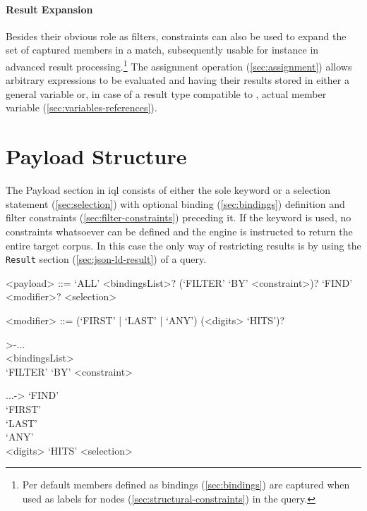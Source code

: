 \documentclass[11pt,a4paper]{report}
\newcommand{\iqlType}[1]{\texttt{\iqlns#1}}
\begin{document}
\paragraph{Result Expansion}
Besides their obvious role as filters, constraints can also be used to expand the set of captured members in a match, subsequently usable for instance in advanced result processing.\footnote{Per default members defined as bindings (\ref{sec:bindings}) are captured when used as labels for nodes (\ref{sec:structural-constraints}) in the query.}
The assignment operation (\ref{sec:assignment}) allows arbitrary expressions to be evaluated and having their results stored in either a general variable or, in case of a result type compatible to , actual member variable (\ref{sec:variables-references}).

\section{Payload Structure}
\label{sec:payload-structure}

The Payload section in \ac{iql} consists of either the sole  keyword or a selection statement (\ref{sec:selection}) with optional binding (\ref{sec:bindings}) definition and filter constraints (\ref{sec:filter-constraints}) preceding it.
If the  keyword is used, no constraints whatsoever can be defined and the engine is instructed to return the entire target corpus.
In this case the only way of restricting results is by using the \iqlType{Result} section (\ref{sec:json-ld-result}) of a query.

\begin{gram}
	\label{gram:payload}
	\begin{grammar}	
		<payload> ::= `ALL' 
		\alt <bindingsList>? (`FILTER' `BY' <constraint>)? `FIND' <modifier>? <selection>
		
		<modifier> ::= (`FIRST' | `LAST' | `ANY') (<digits> `HITS')?	
	\end{grammar}
	\diagsep
	\begin{samepage} %
	\begin{rrfrag}{>-}{...}
		\sst \\ <bindingsList> \est \sst \\ `FILTER' `BY' <constraint> \est 
	\end{rrfrag}
	\newline
	\begin{rrfrag}{...}{->}
		`FIND' \sst \\
			\sst `FIRST' \\ `LAST' \\ `ANY' \est
			\sst \\ <digits> `HITS' \est
		\est <selection>
	\end{rrfrag}
	\end{samepage}
\end{gram}
\end{document}
